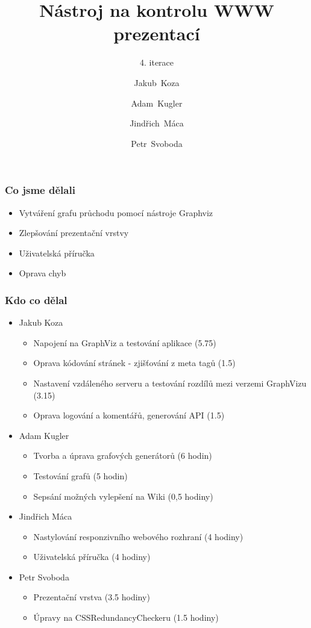 \documentclass{beamer}
\begin{document}
\title [NKWP]{Nástroj na kontrolu WWW prezentací}
\author[J.~ Koza, A.~ Kugler, J.~Máca, P.~Svoboda]{Jakub~Koza \and Adam~Kugler \and Jindřich~Máca \and Petr~Svoboda}

\subtitle{4. iterace}
\frame{\titlepage}
\begin{frame}[allowframebreaks]\frametitle{Co jsme dělali}
   \begin{itemize}
    \item Vytváření grafu průchodu pomocí nástroje Graphviz
		\item Zlepšování prezentační vrstvy
		\item Uživatelská příručka
		\item Oprava chyb
   \end{itemize}
\end{frame}

\begin{frame}[allowframebreaks]\frametitle{Kdo co dělal} 
  \begin{itemize}
    \item Jakub Koza
      \begin{itemize}
       \item Napojení na GraphViz a testování aplikace (5.75)
       \item Oprava kódování stránek - zjišťování z meta tagů (1.5)
       \item Nastavení vzdáleného serveru a testování rozdílů mezi verzemi GraphVizu (3.15)
       \item Oprava logování a komentářů, generování API (1.5)
     \end{itemize}

    \item Adam Kugler
      \begin{itemize}
       \item Tvorba a úprava grafových generátorů (6 hodin)
       \item Testování grafů (5 hodin)
       \item Sepsání možných vylepšení na Wiki (0,5 hodiny)
     \end{itemize}
	\newpage
    \item Jindřich Máca
      \begin{itemize}
       \item Nastylování responzivního webového rozhraní (4 hodiny)
			 \item Uživatelská příručka (4 hodiny)
     \end{itemize}
	
    \item Petr Svoboda
      \begin{itemize}
       \item Prezentační vrstva (3.5 hodiny)
       \item Úpravy na CSSRedundancyCheckeru (1.5 hodiny)
     \end{itemize}
   \end{itemize}  
\end{frame} 
\end{document}
